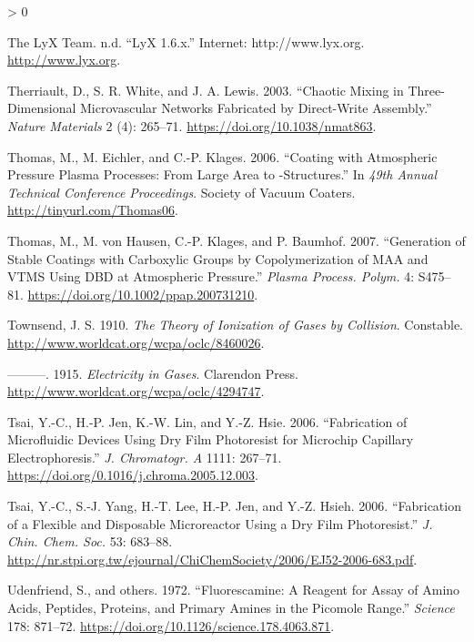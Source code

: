 \documentclass[
  10pt,
  twoside]{article}
\newlength{\cslhangindent}
\newenvironment{CSLReferences}[2] %
 {%
  \setlength{\parindent}{0pt}
  \ifodd #1 \everypar{\setlength{\hangindent}{\cslhangindent}}\ignorespaces\fi
  \ifnum #2 > 0
  \setlength{\parskip}{#2\baselineskip}
  \fi
 }%
 {}
\begin{document}
\begin{CSLReferences}{1}{0}
\leavevmode\hypertarget{ref-LyX}{}%
The LyX Team. n.d. {``LyX 1.6.x.''} Internet: http://www.lyx.org. \url{http://www.lyx.org}.

\leavevmode\hypertarget{ref-Ther03}{}%
Therriault, D., S. R. White, and J. A. Lewis. 2003. {``Chaotic Mixing in Three-Dimensional Microvascular Networks Fabricated by Direct-Write Assembly.''} \emph{Nature Materials} 2 (4): 265--71. \url{https://doi.org/10.1038/nmat863}.

\leavevmode\hypertarget{ref-Thom06}{}%
Thomas, M., M. Eichler, and C.-P. Klages. 2006. {``Coating with Atmospheric Pressure Plasma Processes: From Large Area to {}-Structures.''} In \emph{49th Annual Technical Conference Proceedings}. Society of Vacuum Coaters. \url{http://tinyurl.com/Thomas06}.

\leavevmode\hypertarget{ref-Thom07}{}%
Thomas, M., M. von Hausen, C.-P. Klages, and P. Baumhof. 2007. {``Generation of Stable Coatings with Carboxylic Groups by Copolymerization of {MAA} and {VTMS} Using {DBD} at Atmospheric Pressure.''} \emph{Plasma Process. Polym.} 4: S475--81. \url{https://doi.org/10.1002/ppap.200731210}.

\leavevmode\hypertarget{ref-Town1910}{}%
Townsend, J. S. 1910. \emph{The Theory of Ionization of Gases by Collision}. Constable. \url{http://www.worldcat.org/wcpa/oclc/8460026}.

\leavevmode\hypertarget{ref-Town1915}{}%
---------. 1915. \emph{Electricity in Gases}. Clarendon Press. \url{http://www.worldcat.org/wcpa/oclc/4294747}.

\leavevmode\hypertarget{ref-Tsai06-2}{}%
Tsai, Y.-C., H.-P. Jen, K.-W. Lin, and Y.-Z. Hsie. 2006. {``Fabrication of Microfluidic Devices Using Dry Film Photoresist for Microchip Capillary Electrophoresis.''} \emph{J. Chromatogr. A} 1111: 267--71. \url{https://doi.org/0.1016/j.chroma.2005.12.003}.

\leavevmode\hypertarget{ref-Tsai06-1}{}%
Tsai, Y.-C., S.-J. Yang, H.-T. Lee, H.-P. Jen, and Y.-Z. Hsieh. 2006. {``Fabrication of a Flexible and Disposable Microreactor Using a Dry Film Photoresist.''} \emph{J. Chin. Chem. Soc.} 53: 683--88. \url{http://nr.stpi.org.tw/ejournal/ChiChemSociety/2006/EJ52-2006-683.pdf}.

\leavevmode\hypertarget{ref-Uden1972}{}%
Udenfriend, S., and others. 1972. {``Fluorescamine: A Reagent for Assay of Amino Acids, Peptides, Proteins, and Primary Amines in the Picomole Range.''} \emph{Science} 178: 871--72. \url{https://doi.org/10.1126/science.178.4063.871}.


\end{CSLReferences}
\end{document}
